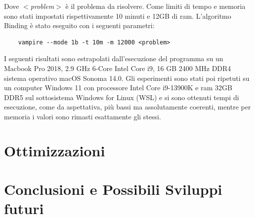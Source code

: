 \documentclass[./main.tex]{subfiles}
\begin{document}
Dove \textit{$<$problem$>$} è il problema da risolvere. 
Come limiti di tempo e memoria sono stati impostati rispettivamente 10 minuti e 12GB di ram.
L'algoritmo Binding è stato eseguito con i seguenti parametri:
\begin{verbatim}
    vampire --mode 1b -t 10m -m 12000 <problem>
\end{verbatim}
I seguenti risultati sono estrapolati dall'esecuzione del programma su un 
Macbook Pro 2018, 2.9 GHz 6-Core Intel Core i9, 16 GB 2400 MHz DDR4 sistema operativo macOS Sonoma 14.0.
Gli esperimenti sono stati poi ripetuti su un computer Windows 11 con processore Intel Core i9-13900K e ram 32GB DDR5
sul sottosistema Windows for Linux (WSL) e si sono ottenuti tempi di esecuzione, come da aspettativa, più bassi ma assolutamente coerenti,
mentre per memoria i valori sono rimasti esattamente gli stessi.


\section{Ottimizzazioni}
\section{Conclusioni e Possibili Sviluppi futuri}
\end{document}
